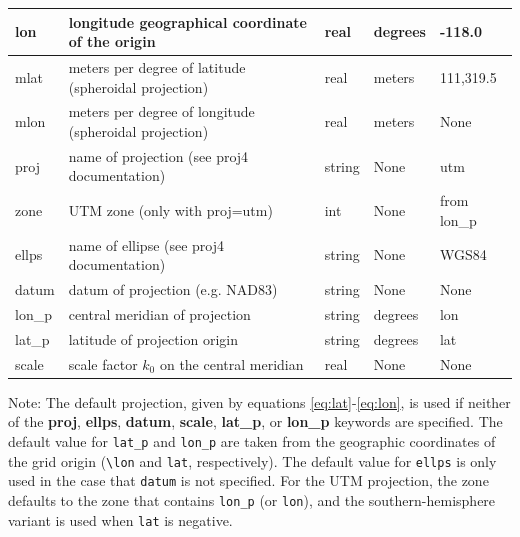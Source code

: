 \documentclass[11pt]{report}
\begin{document}
{\begin{center}
\begin{tabular}{|l|p{8cm}|l|l|l|}
		lon         & longitude geographical coordinate of the origin        & real      & degrees    & -118.0       \\ \hline
		mlat        & meters per degree of latitude (spheroidal projection)  & real      & meters     & 111,319.5    \\ \hline
		mlon        & meters per degree of longitude (spheroidal projection) & real      & meters     & None         \\ \hline
		proj        & name of  projection (see proj4 documentation)          & string    & None       & utm          \\ \hline
		zone        & UTM zone (only with proj=utm)                          & int       & None       & from lon\_p  \\ \hline
		ellps       & name of ellipse (see proj4 documentation)              & string    & None       & WGS84        \\ \hline
		datum       & datum of projection (e.g. NAD83)                       & string    & None       & None         \\ \hline
		lon\_p      & central meridian of projection                         & string    & degrees    & lon          \\ \hline
		lat\_p      & latitude of projection origin                          & string    & degrees    & lat          \\ \hline
		scale       & scale factor $k_0$ on the central meridian             & real      & None       & None      \\ \hline
	\end{tabular}
\end{center}
Note: The default projection, given by equations \eqref{eq:lat}-\eqref{eq:lon}, is used if neither
of the {\bf proj}, {\bf ellps}, {\bf datum}, {\bf scale}, {\bf lat\_p}, or {\bf lon\_p} keywords
are specified. The default value for \verb+lat_p+ and \verb+lon_p+ are taken from the geographic
coordinates of the grid origin (\verb+\lon+ and \verb+lat+, respectively). The default value for
\verb+ellps+ is only used in the case that \verb+datum+ is not specified.
For the UTM projection, the zone defaults to the zone that contains \verb+lon_p+ (or \verb+lon+), and the
southern-hemisphere variant is used when \verb+lat+ is negative.


}
\end{document}
